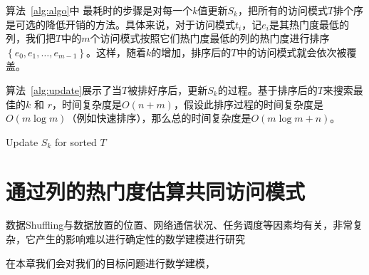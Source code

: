 \par 算法~\ref{alg:algo}中 最耗时的步骤是对每一个$k$值更新$S_k$，把所有的访问模式$T$排个序是可选的降低开销的方法。具体来说，对于访问模式$t_i$，记$e_i$是其热门度最低的列，我们把$T$中的$m$个访问模式按照它们热门度最低的列的热门度进行排序$\left\{e_{0}, e_{1}, \dots, e_{m-1}\right\}$。这样，随着$k$的增加，排序后的$T$中的访问模式就会依次被覆盖。

\par 算法~\ref{alg:update}展示了当$T$被排好序后，更新$S_k$的过程。基于排序后的$T$来搜索最佳的$k$ 和 $r$，时间复杂度是$O(n + m)$，假设此排序过程的时间复杂度是$O(m\log{m})$（例如快速排序），那么总的时间复杂度是$O(m\log{m} + n)$。

\begin{algorithm}[tb]
	\caption{Update $S_k$ for sorted $T$}
	\label{alg:update}
	\small
	\begin{algorithmic}[1]
		\Else
		\State{\Return}
		\EndIf
		\EndFor
		\EndFunction
		
	\end{algorithmic}
\end{algorithm}

\section{通过列的热门度估算共同访问模式}
数据Shuffling与数据放置的位置、网络通信状况、任务调度等因素均有关，非常复杂，它产生的影响难以进行确定性的数学建模进行研究
\par 在本章我们会对我们的目标问题进行数学建模，

